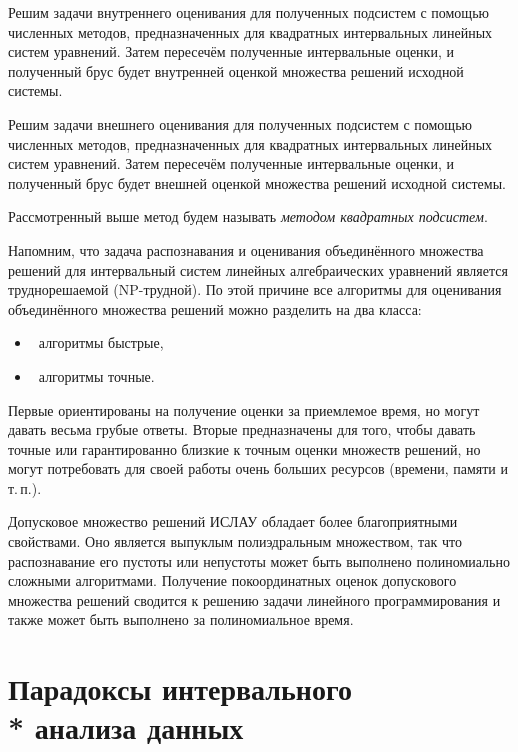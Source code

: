 \documentclass[a5paper,openany]{book}
\begin{document}
Решим задачи внутреннего оценивания для полученных подсистем с помощью численных методов, 
предназначенных для квадратных интервальных линейных систем уравнений. Затем пересечём 
полученные интервальные оценки, и полученный брус будет внутренней оценкой множества 
решений исходной системы. 
  
Решим задачи внешнего оценивания для полученных подсистем с помощью численных методов, 
предназначенных для квадратных интервальных линейных систем уравнений. Затем пересечём 
полученные интервальные оценки, и полученный брус будет внешней оценкой множества 
решений исходной системы. 
      
Рассмотренный выше метод будем называть \textit{методом квадратных подсистем}. 
  
Напомним, что задача распознавания и оценивания объединённого множества решений 
для интервальный систем линейных алгебраических уравнений является труднорешаемой 
(NP-трудной). По этой причине все алгоритмы для оценивания объединённого множества 
решений можно разделить на два класса: 
\begin{itemize} 
\item \ 
алгоритмы быстрые,  
\item \ 
алгоритмы точные.  
\end{itemize} 
Первые ориентированы на получение оценки за приемлемое время, но могут давать весьма 
грубые ответы. Вторые предназначены для того, чтобы давать точные или гарантированно 
близкие к точным оценки множеств решений, но могут потребовать для своей работы 
очень больших ресурсов (времени, памяти и т.\,п.). 
  
Допусковое множество решений ИСЛАУ обладает более благоприятными свойствами. Оно 
является выпуклым полиэдральным множеством, так что распознавание его пустоты или 
непустоты может быть выполнено полиномиально сложными алгоритмами. Получение 
покоординатных оценок допускового множества решений сводится к решению задачи 
линейного программирования и также может быть выполнено за полиномиальное время. 
  
  
  
\section[Парадоксы интервального анализа данных]%
        {Парадоксы интервального \\* анализа данных} 
\label{IStatParadoxesSect}
  
\end{document}
